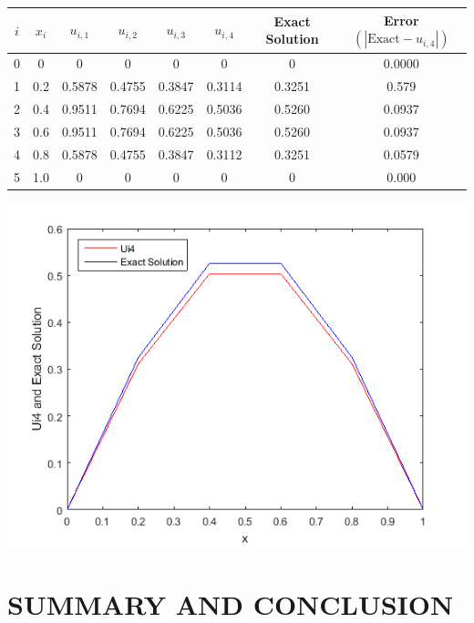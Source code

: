 \documentclass[12pt]{report}
\begin{document}
\begin{tabular}{c|c|c|c|c|c|c|c}
$i$ & $x_i$ & $u_{i,1}$ & $u_{i,2}$ & $u_{i,3}$ & $u_{i,4}$ & Exact Solution & Error $(\left| \text{Exact} - u_{i,4} \right|)$\\ \hline
0 & 0 & 0 & 0 & 0 & 0 & 0 & 0.0000 \\ \hline
1 & 0.2 & 0.5878 & 0.4755 & 0.3847 & 0.3114 & 0.3251 & 0.579 \\ \hline
2 & 0.4 & 0.9511 & 0.7694 & 0.6225 & 0.5036 & 0.5260 & 0.0937 \\ \hline
3 & 0.6 & 0.9511 & 0.7694 & 0.6225 & 0.5036 & 0.5260 & 0.0937 \\ \hline
4 & 0.8 & 0.5878 & 0.4755 & 0.3847 & 0.3112 & 0.3251 & 0.0579 \\ \hline
5 & 1.0 & 0	& 0 & 0 & 0 & 0 & 0.000 \\
\end{tabular}
\begin{center}
	\noindent \includegraphics[]{graph_f}
\end{center}

\chapter{SUMMARY AND CONCLUSION}
\end{document}
